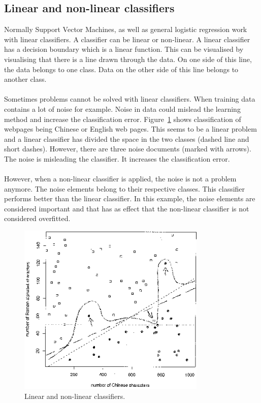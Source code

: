 \subsection{Linear and non-linear classifiers}
\noindent Normally Support Vector Machines, as well as general logistic regression work with linear classifiers. A classifier can be linear or non-linear. A linear classifier has a decision boundary which is a linear function. This can be visualised by visualising that there is a line drawn through the data. On one side of this line, the data belongs to one class. Data on the other side of this line belongs to another class. \cite{linearClassifier} \\
\\
Sometimes problems cannot be solved with linear classifiers. When training data contains a lot of noise for example. Noise in data could mislead the learning method and increase the classification error. Figure~\ref{fig:linearvsNonLinearClassifier} shows classification of webpages being Chinese or English web pages. This seems to be a linear problem and a linear classifier has divided the space in the two classes (dashed line and short dashes). However, there are three noise documents (marked with arrows). The noise is misleading the classifier. It increases the classification error. \cite{linearvsNonLinearClassifier} \\
\\
However, when a non-linear classifier is applied, the noise is not a problem anymore. The noise elements belong to their respective classes. This classifier performs better than the linear classifier. In this example, the noise elements are considered important and that has as effect that the non-linear classifier is not considered overfitted. \cite{linearvsNonLinearClassifier}

\begin{figure}[H]
\centering
\includegraphics[width=0.8\textwidth]{Figures/classifierNoise}
\decoRule
\caption[Linear and non-linear classifiers]{Linear and non-linear classifiers. \cite{linearvsNonLinearClassifier}}
\label{fig:linearvsNonLinearClassifier}
\end{figure}

